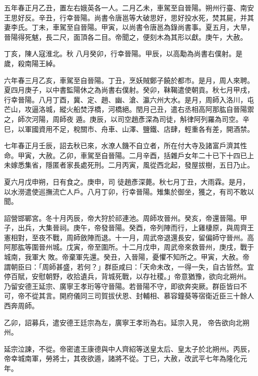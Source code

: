 \begin{pinyinscope}
 五年春正月乙丑，置左右娥英各一人。二月乙未，車駕至自晉陽。朔州行臺、南安王思好反。辛丑，行幸晉陽。尚書令唐邕等大破思好，思好投水死，焚其屍，并其妻李氏。丁未，車駕至自晉陽。甲寅，以尚書令唐邕為錄尚書事。夏五月，大旱，晉陽得死魃，長二尺，面頂各二目。帝聞之，便刻木為其形以獻。庚午，大赦。



 丁亥，陳人寇淮北。秋
 八月癸卯，行幸晉陽。甲辰，以高勱為尚書右僕射。是歲，殺南陽王綽。



 六年春三月乙亥，車駕至自晉陽。丁丑，烹妖賊鄭子饒於都市。是月，周人來聘。夏四月庚子，以中書監陽休之為尚書右僕射。癸卯，靺鞨遣使朝貢。秋七月甲戌，行幸晉陽。八月丁酉，冀、定、趙、幽、滄、瀛六州大水。是月，周師入洛川，屯芒山，攻逼洛城，縱火船焚浮橋，河橋絕。閏月己丑，遣右丞相高阿那肱自晉陽禦之，師次河陽，周師夜
 遁。庚辰，以司空趙彥深為司徒，斛律阿列羅為司空。辛巳，以軍國資用不足，稅關市、舟車、山澤、鹽鐵、店肆，輕重各有差，開酒禁。



 七年春正月壬辰，詔去秋已來，水潦人饑不自立者，所在付大寺及諸富戶濟其性命。甲寅，大赦。乙卯，車駕至自晉陽。二月辛酉，括雜戶女年二十已下十四已上未嫁悉集省，隱匿者家長處死刑。二月丙寅，風從西北起，發屋拔樹，五日乃止。



 夏六月戊申朔，日有食之。庚申，司
 徒趙彥深薨。秋七月丁丑，大雨霖。是月，以水澇遣使巡撫流亡人戶。八月丁卯，行幸晉陽。雉集於御坐，獲之，有司不敢以聞。



 詔營邯鄲宮。冬十月丙辰，帝大狩於祁連池。周師攻晉州。癸亥，帝還晉陽。甲子，出兵，大集晉祠。庚午，帝發晉陽。癸酉，帝列陣而行，上雞棲原，與周齊王憲相對，至夜不戰，周師斂陣而退。十一月，周武帝退還長安，留偏師守晉州。高阿那肱等圍晉州城。戊寅，帝至圍所。十二月戊申，周武帝來救晉州，庚戌，戰于城南，我軍大
 敗。帝棄軍先還。癸丑，入晉陽，憂懼不知所之。甲寅，大赦。帝謂朝臣曰：「周師甚盛，若何？」群臣咸曰：「天命未改，一得一失，自古皆然。宜停百賦，安慰朝野，收拾遺兵，背城死戰，以存社稷。」帝意猶豫，欲向北朔州。乃留安德王延宗、廣寧王孝珩等守晉陽。若晉陽不守，即欲奔突厥。群臣皆曰不可，帝不從其言。開府儀同三司賀拔伏恩、封輔相、慕容鐘葵等宿衛近臣三十餘人西奔周師。



 乙卯，詔募兵，遣安德王廷宗為左，廣寧王孝珩為右。延宗入見，
 帝告欲向北朔州。



 延宗泣諫，不從。帝密遣王康德與中人齊紹等送皇太后、皇太子於北朔州。丙辰，帝幸城南軍，勞將士，其夜欲遁，諸將不從。丁巳，大赦，改武平七年為隆化元年。




\end{pinyinscope}
